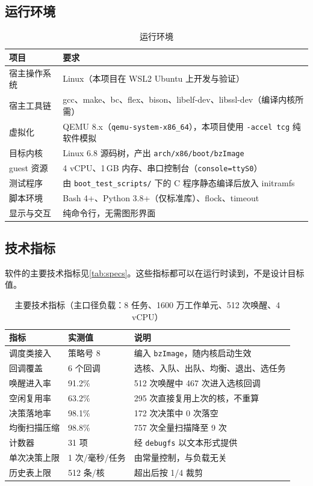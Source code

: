 \documentclass[11pt,a4paper]{article}
\newcommand{\code}[1]{\texttt{#1}}
\begin{document}
\subsection{运行环境}

\begin{table}[H]
\centering
\caption{运行环境}
\label{tab:env}
\small
\begin{tabular}{@{}p{3.4cm}p{10.6cm}@{}}
\toprule
项目 & 要求 \\
\midrule
宿主操作系统 & Linux（本项目在 WSL2 Ubuntu 上开发与验证） \\
宿主工具链 & gcc、make、bc、flex、bison、libelf-dev、libssl-dev（编译内核所需） \\
虚拟化 & QEMU 8.x（\code{qemu-system-x86\_64}），本项目使用 \code{-accel tcg} 纯软件模拟 \\
目标内核 & Linux 6.8 源码树，产出 \code{arch/x86/boot/bzImage} \\
guest 资源 & 4 vCPU、1\,GB 内存、串口控制台（\code{console=ttyS0}） \\
测试程序 & 由 \code{boot\_test\_scripts/} 下的 C 程序静态编译后放入 initramfs \\
脚本环境 & Bash 4+、Python 3.8+（仅标准库）、flock、timeout \\
显示与交互 & 纯命令行，无需图形界面 \\
\bottomrule
\end{tabular}
\end{table}

\subsection{技术指标}

软件的主要技术指标见\autoref{tab:specs}。这些指标都可以在运行时读到，不是设计目标值。

\begin{table}[H]
\centering
\caption{主要技术指标（主口径负载：8 任务、1600 万工作单元、512 次唤醒、4 vCPU）}
\label{tab:specs}
\small
\begin{tabular}{@{}p{4.4cm}p{3.4cm}p{6.2cm}@{}}
\toprule
指标 & 实测值 & 说明 \\
\midrule
调度类接入 & 策略号 8 & 编入 \code{bzImage}，随内核启动生效 \\
回调覆盖 & 6 个回调 & 选核、入队、出队、均衡、退出、选任务 \\
唤醒进入率 & 91.2\% & 512 次唤醒中 467 次进入选核回调 \\
空闲复用率 & 63.2\% & 295 次直接复用上次的核，不重算 \\
决策落地率 & 98.1\% & 172 次决策中 0 次落空 \\
均衡扫描压缩 & 98.8\% & 757 次全量扫描降至 9 次 \\
计数器 & 31 项 & 经 \code{debugfs} 以文本形式提供 \\
单次决策上限 & 1 次/毫秒/任务 & 由常量控制，与负载无关 \\
历史表上限 & 512 条/核 & 超出后按 1/4 裁剪 \\
\bottomrule
\end{tabular}
\end{table}
\end{document}
